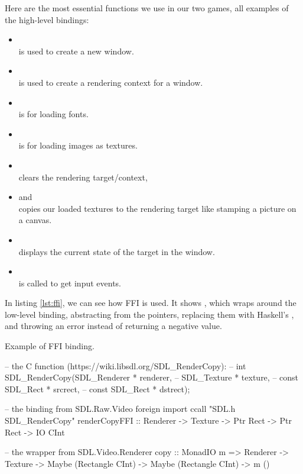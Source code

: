\documentclass[
  digital, %
  color,   %
  table,   %
  oneside, %
  lof,     %
  lot,     %
]{fithesis3}
\begin{document}
Here are the most essential  functions we use in our two games,
all examples of the high-level bindings:
\begin{itemize}[\textendash]
    \item {}\\
    is used to create a new window.
    \item {}\\
    is used to create a rendering context for a window.
    \item {}\\
    is for loading fonts.
    \item {}\\
    is for loading images as textures.
    \item {}\\
    clears the rendering target/context,
    \item {} and \\
    copies our loaded textures to the rendering target like stamping a picture on a canvas.
    \item {}\\
    displays the current state of the target in the window.
    \item {}\\
    is called to get input events.
\end{itemize}
In listing \ref{lst:ffi}, we can see how FFI is used. It shows ,
which wraps around the low-level binding, abstracting from the pointers,
replacing them with Haskell's ,
and throwing an error instead of returning a negative value.

\begin{listing}[H]
\caption{Example of FFI binding.\cite{sdlrepo}}
\label{lst:ffi}
\begin{haskell}
-- the C function (https://wiki.libsdl.org/SDL_RenderCopy):
-- int SDL_RenderCopy(SDL_Renderer * renderer,
--                    SDL_Texture * texture,
--                    const SDL_Rect * srcrect,
--                    const SDL_Rect * dstrect);

-- the binding from SDL.Raw.Video
foreign import ccall "SDL.h SDL_RenderCopy"
    renderCopyFFI :: Renderer
                  -> Texture
                  -> Ptr Rect
                  -> Ptr Rect
                  -> IO CInt

-- the wrapper from SDL.Video.Renderer
copy :: MonadIO m
     => Renderer
     -> Texture
     -> Maybe (Rectangle CInt)
     -> Maybe (Rectangle CInt)
     -> m ()
\end{haskell}
\end{listing}
\end{document}
